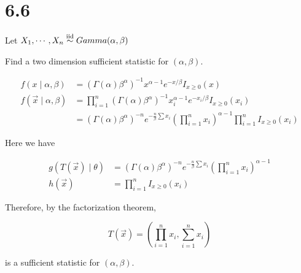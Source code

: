 \section*{6.6}

Let $X_1, \cdots, X_n \stackrel{\text{iid}}{\sim} Gamma(\alpha, \beta)$

\noindent Find a two dimension sufficient statistic for $(\alpha, \beta)$.

\vspace{-5mm}
\begin{align*}
	f(x \mid \alpha, \beta) &= \left( \Gamma(\alpha) \beta^{\alpha} \right)^{-1} x^{\alpha - 1} e^{-x/\beta} I_{x \geq 0}(x) \\
	f(\vec{x} \mid \alpha, \beta) &= \prod_{i=1}^n \left( \Gamma(\alpha) \beta^{\alpha} \right)^{-1}  x_i^{\alpha - 1} e^{-x_i/\beta} I_{x \geq 0}(x_i) \\
	&= \left( \Gamma(\alpha) \beta^{\alpha} \right)^{-n} e^{-\frac{n}{\beta} \sum x_i} \left( \prod_{i=1}^n x_i \right)^{\alpha - 1} \prod_{i=1}^n I_{x \geq 0}(x_i)  
\end{align*}

Here we have 

\vspace{-5mm}
\begin{align*}
	g(T(\vec{x}) \mid \theta) &=  \left( \Gamma(\alpha) \beta^{\alpha} \right)^{-n} e^{-\frac{n}{\beta} \sum x_i} \left( \prod_{i=1}^n x_i \right)^{\alpha - 1} \\
	h(\vec{x}) &= \prod_{i=1}^n I_{x \geq 0}(x_i) 
\end{align*}

Therefore, by the factorization theorem, 

\[T(\vec{x}) = \left( \prod_{i=1}^n x_i, \sum_{i=1}^n x_i \right)\]

is a sufficient statistic for $(\alpha, \beta)$.

